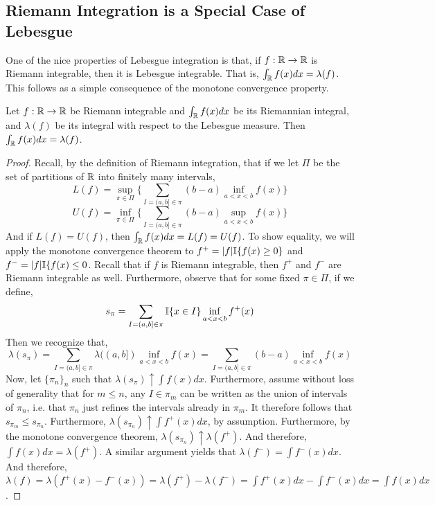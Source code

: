     \subsection{Riemann Integration is a Special Case of Lebesgue}

    One of the nice properties of Lebesgue integration is that, if $f : \mathbb R \to \mathbb R$ is 
    Riemann integrable, then it is Lebesgue integrable. That is, $\int_\mathbb R f(x)dx = \lambda(f)$. 
    This follows as a simple consequence of the monotone convergence property. 

    \begin{theorem} 
        Let $f : \mathbb R \to \mathbb R$ be Riemann integrable and $\int_\mathbb R f(x)dx$ be its 
        Riemannian integral, and $\lambda(f)$ be its integral with respect to the 
        Lebesgue measure. Then $\int_\mathbb R f(x)dx = \lambda(f)$. 
    \end{theorem}

    \begin{proof} 
        Recall, by the definition of Riemann integration, that if we let 
        $\Pi$ be the set of partitions of $\mathbb R$ into finitely many intervals,
        \[ L(f) = \sup_{\pi \in \Pi}\bigg\{ \sum_{I = (a,b] \in \pi} (b-a)\inf_{a < x < b}f(x) \bigg\}\]
        \[ U(f) = \inf_{\pi \in \Pi}\bigg\{ \sum_{I = (a,b] \in \pi} (b-a)\sup_{a < x < b}f(x) \bigg\}\]
        And if $L(f) = U(f)$, then $\int_\mathbb R f(x)dx = L(f) = U(f)$. To show equality, we will apply the monotone convergence 
        theorem to $f^+ = |f|\mathbb I\{f(x) \geq 0\}$ and $f^- = |f|\mathbb I\{f(x) \leq 0$. Recall that if $f$ is Riemann integrable, 
        then $f^+$ and $f^-$ are Riemann integrable as well. Furthermore, 
        observe that for some fixed $\pi \in \Pi$, if we define,
        \[ s_\pi = \sum_{I = (a,b] \in \pi} \mathbb I\{x \in I\} \inf_{a < x < b}f^+(x)  \]
        Then we recognize that, 
        \[ \lambda(s_\pi) = \sum_{I = (a,b] \in \pi} \lambda((a,b])\inf_{a < x < b}f(x) = \sum_{I = (a,b] \in \pi} (b-a)\inf_{a < x < b}f(x)  \]
        Now, let $\{\pi_n\}_n$ such that $\lambda(s_\pi) \uparrow \int f(x)dx$. Furthermore, 
        assume without loss of generality that for $m \leq n$, any $I \in \pi_m$ can be written as 
        the union of intervals of $\pi_n$, i.e. that $\pi_n$ just refines the intervals already in $\pi_m$. 
        It therefore follows that $s_{\pi_m} \leq s_{\pi_n}$. Furthermore, 
        $\lambda(s_{\pi_n}) \uparrow \int f^+(x)dx$, by assumption. Furthermore, by the 
        monotone convergence theorem, $\lambda(s_{\pi_n}) \uparrow \lambda(f^+)$. 
        And therefore, $\int f(x)dx = \lambda(f^+)$. A similar argument yields that 
        $\lambda(f^-) = \int f^-(x)dx$. And therefore, $\lambda(f) = \lambda (f^+(x) - f^-(x)) 
        = \lambda(f^+) -\lambda(f^-) = \int f^+(x)dx - \int f^-(x)dx = \int f(x)dx$. 




    \end{proof}

